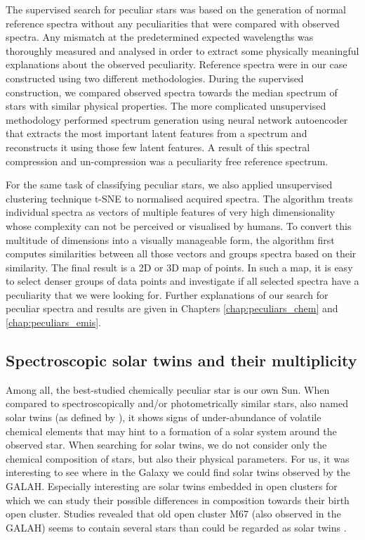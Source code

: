 The supervised search for peculiar stars was based on the generation of normal reference spectra without any peculiarities that were compared with observed spectra. Any mismatch at the predetermined expected wavelengths was thoroughly measured and analysed in order to extract some physically meaningful explanations about the observed peculiarity. Reference spectra were in our case constructed using two different methodologies. During the supervised construction, we compared observed spectra towards the median spectrum of stars with similar physical properties. The more complicated unsupervised methodology performed spectrum generation using neural network autoencoder that extracts the most important latent features from a spectrum and reconstructs it using those few latent features. A result of this spectral compression and un-compression was a peculiarity free reference spectrum.

For the same task of classifying peculiar stars, we also applied unsupervised clustering technique t-SNE \cite{2013arXiv1301.3342V} to normalised acquired spectra. The algorithm treats individual spectra as vectors of multiple features of very high dimensionality whose complexity can not be perceived or visualised by humans. To convert this multitude of dimensions into a visually manageable form, the algorithm first computes similarities between all those vectors and groups spectra based on their similarity. The final result is a 2D or 3D map of points. In such a map, it is easy to select denser groups of data points and investigate if all selected spectra have a peculiarity that we were looking for. Further explanations of our search for peculiar spectra and results are given in Chapters \ref{chap:peculiars_chem} and \ref{chap:peculiars_emis}.

\subsection{Spectroscopic solar twins and their multiplicity}
Among all, the best-studied chemically peculiar star is our own Sun. When compared to spectroscopically and/or photometrically similar stars, also named solar twins (as defined by \cite{2017AN....338..442A}), it shows signs of under-abundance of volatile chemical elements \cite{2009ApJ...704L..66M} that may hint to a formation of a solar system around the observed star. When searching for solar twins, we do not consider only the chemical composition of stars, but also their physical parameters. For us, it was interesting to see where in the Galaxy we could find solar twins observed by the GALAH. Especially interesting are solar twins embedded in open clusters for which we can study their possible differences in composition towards their birth open cluster. Studies revealed that old open cluster M67 (also observed in the GALAH) seems to contain several stars than could be regarded as solar twins \cite{2009MmSAI..80..125B, 2016MNRAS.463..696L}.

